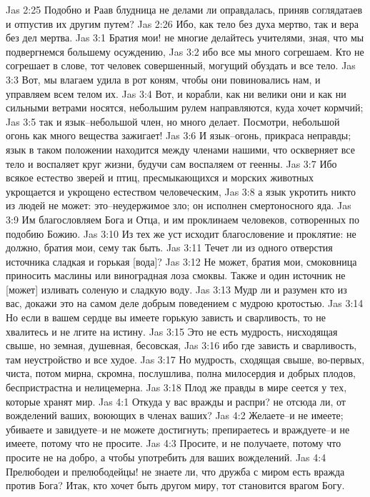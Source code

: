 Jas 2:25  Подобно и Раав блудница не делами ли оправдалась, приняв соглядатаев и отпустив их другим путем?
Jas 2:26  Ибо, как тело без духа мертво, так и вера без дел мертва.
Jas 3:1  Братия мои! не многие делайтесь учителями, зная, что мы подвергнемся большему осуждению,
Jas 3:2  ибо все мы много согрешаем. Кто не согрешает в слове, тот человек совершенный, могущий обуздать и все тело.
Jas 3:3  Вот, мы влагаем удила в рот коням, чтобы они повиновались нам, и управляем всем телом их.
Jas 3:4  Вот, и корабли, как ни велики они и как ни сильными ветрами носятся, небольшим рулем направляются, куда хочет кормчий;
Jas 3:5  так и язык--небольшой член, но много делает. Посмотри, небольшой огонь как много вещества зажигает!
Jas 3:6  И язык--огонь, прикраса неправды; язык в таком положении находится между членами нашими, что оскверняет все тело и воспаляет круг жизни, будучи сам воспаляем от геенны.
Jas 3:7  Ибо всякое естество зверей и птиц, пресмыкающихся и морских животных укрощается и укрощено естеством человеческим,
Jas 3:8  а язык укротить никто из людей не может: это--неудержимое зло; он исполнен смертоносного яда.
Jas 3:9  Им благословляем Бога и Отца, и им проклинаем человеков, сотворенных по подобию Божию.
Jas 3:10  Из тех же уст исходит благословение и проклятие: не должно, братия мои, сему так быть.
Jas 3:11  Течет ли из одного отверстия источника сладкая и горькая [вода]?
Jas 3:12  Не может, братия мои, смоковница приносить маслины или виноградная лоза смоквы. Также и один источник не [может] изливать соленую и сладкую воду.
Jas 3:13  Мудр ли и разумен кто из вас, докажи это на самом деле добрым поведением с мудрою кротостью.
Jas 3:14  Но если в вашем сердце вы имеете горькую зависть и сварливость, то не хвалитесь и не лгите на истину.
Jas 3:15  Это не есть мудрость, нисходящая свыше, но земная, душевная, бесовская,
Jas 3:16  ибо где зависть и сварливость, там неустройство и все худое.
Jas 3:17  Но мудрость, сходящая свыше, во-первых, чиста, потом мирна, скромна, послушлива, полна милосердия и добрых плодов, беспристрастна и нелицемерна.
Jas 3:18  Плод же правды в мире сеется у тех, которые хранят мир.
Jas 4:1  Откуда у вас вражды и распри? не отсюда ли, от вожделений ваших, воюющих в членах ваших?
Jas 4:2  Желаете--и не имеете; убиваете и завидуете--и не можете достигнуть; препираетесь и враждуете--и не имеете, потому что не просите.
Jas 4:3  Просите, и не получаете, потому что просите не на добро, а чтобы употребить для ваших вожделений.
Jas 4:4  Прелюбодеи и прелюбодейцы! не знаете ли, что дружба с миром есть вражда против Бога? Итак, кто хочет быть другом миру, тот становится врагом Богу.
